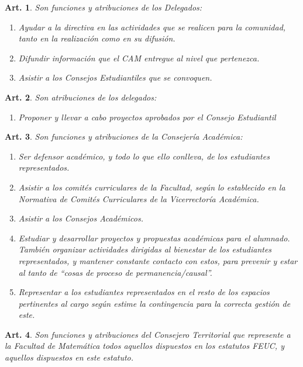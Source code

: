 \documentclass[letterpaper,11pt]{article}
\theoremstyle{plain}
\newtheorem{art}{Art.} %
\begin{document}
\begin{art}\label{funcionesDelegados}
	Son funciones y atribuciones de los Delegados:
	\begin{enumerate}
		\item Ayudar a la directiva en las actividades que se realicen para la comunidad, tanto en la realización como en su difusión.
		\item Difundir información que el CAM entregue al nivel que pertenezca.
		\item Asistir a los Consejos Estudiantiles que se convoquen.
	\end{enumerate}
\end{art}
\begin{art}\label{atribucionesDelegados}
	Son atribuciones de los delegados:
	\begin{enumerate}
		\item Proponer y llevar a cabo proyectos aprobados por el Consejo Estudiantil
	\end{enumerate}
\end{art}

\begin{art}\label{funcionesConsejeriaAcademica}
	Son funciones y atribuciones de la Consejería Académica:
	\begin{enumerate}
		\item Ser defensor académico, y todo lo que ello conlleva, de los estudiantes representados. %
		\item Asistir a los comités curriculares de la Facultad, según lo establecido en la Normativa de Comités Curriculares de la Vicerrectoría Académica.
		\item Asistir a los Consejos Académicos.
		\item Estudiar y desarrollar proyectos y propuestas académicas para el alumnado. También organizar actividades dirigidas al bienestar de los estudiantes representados, y mantener constante contacto con estos, para prevenir y estar al tanto de ``cosas de proceso de permanencia/causal''.%
		\item Representar a los estudiantes representados en el resto de los espacios pertinentes al cargo según estime la contingencia para la correcta gestión de este.
	\end{enumerate}
\end{art}

\begin{art}\label{funcionesConsejeroTerritorial}
	Son funciones y atribuciones del Consejero Territorial que represente a la Facultad de Matemática todos aquellos dispuestos en los estatutos FEUC, y aquellos dispuestos en este estatuto.
\end{art}
\end{document}
